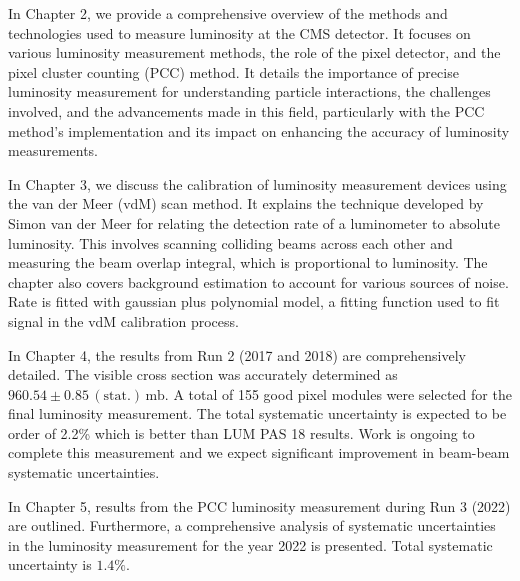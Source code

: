 In Chapter 2, we provide a comprehensive overview of the methods and technologies used to measure luminosity at the CMS detector. It focuses on various luminosity measurement methods, the role of the pixel detector, and the pixel cluster counting (PCC) method. It details the importance of precise luminosity measurement for understanding particle interactions, the challenges involved, and the advancements made in this field, particularly with the PCC method's implementation and its impact on enhancing the accuracy of luminosity measurements.

In Chapter 3, we discuss the calibration of luminosity measurement devices using the van der Meer (vdM) scan method. It explains the technique developed by Simon van der Meer for relating the detection rate of a luminometer to absolute luminosity. This involves scanning colliding beams across each other and measuring the beam overlap integral, which is proportional to luminosity. The chapter also covers background estimation to account for various sources of noise. Rate is fitted with gaussian plus polynomial model, a fitting function used to fit signal in the vdM calibration process.

In Chapter 4, the results from Run 2 (2017 and 2018) are comprehensively detailed. %
The visible cross section was accurately determined as \(960.54 \pm 0.85 \, (\text{stat.}) \, \text{mb}\). A total of 155 good pixel modules were selected for the final luminosity measurement. %
The total systematic uncertainty is expected to be order of 2.2\% which is better than LUM PAS 18 results. Work is ongoing to complete this measurement and we expect significant improvement in beam-beam systematic uncertainties. 

In Chapter 5, results from the PCC luminosity measurement during Run 3 (2022) are outlined. %
Furthermore, a comprehensive analysis of systematic uncertainties in the luminosity measurement for the year 2022 is presented. %
Total systematic uncertainty is \(1.4\%\).

